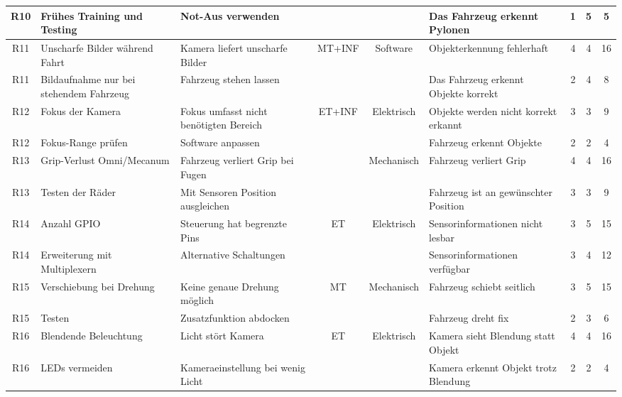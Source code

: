 \documentclass[../main.tex]{subfiles}
\begin{document}
\begin{landscape}
\begin{longtable}{|c|p{4cm}|p{4cm}|c|c|p{4cm}|c|c|c|}
\rowcolor{white} R10 & Frühes Training und Testing & Not-Aus verwenden & & & Das Fahrzeug erkennt Pylonen & 1 & 5 & 5 \\ \hline
\rowcolor[HTML]{F5F5F5} R11 & Unscharfe Bilder während Fahrt & Kamera liefert unscharfe Bilder & MT+INF & Software & Objekterkennung fehlerhaft & 4 & 4 & 16 \\ \hline
\rowcolor[HTML]{F5F5F5} R11 & Bildaufnahme nur bei stehendem Fahrzeug & Fahrzeug stehen lassen & & & Das Fahrzeug erkennt Objekte korrekt & 2 & 4 & 8 \\ \hline

\rowcolor{white} R12 & Fokus der Kamera & Fokus umfasst nicht benötigten Bereich & ET+INF & Elektrisch & Objekte werden nicht korrekt erkannt & 3 & 3 & 9 \\ \hline
\rowcolor{white} R12 & Fokus-Range prüfen & Software anpassen & & & Fahrzeug erkennt Objekte & 2 & 2 & 4 \\ \hline

\rowcolor[HTML]{F5F5F5} R13 & Grip-Verlust Omni/Mecanum & Fahrzeug verliert Grip bei Fugen & & Mechanisch & Fahrzeug verliert Grip & 4 & 4 & 16 \\ \hline

\rowcolor[HTML]{F5F5F5} R13 & Testen der Räder & Mit Sensoren Position ausgleichen & & & Fahrzeug ist an gewünschter Position & 3 & 3 & 9 \\ \hline
\rowcolor{white} R14 & Anzahl GPIO & Steuerung hat begrenzte Pins & ET & Elektrisch & Sensorinformationen nicht lesbar & 3 & 5 & 15 \\ \hline
\rowcolor{white} R14 & Erweiterung mit Multiplexern & Alternative Schaltungen & & & Sensorinformationen verfügbar & 3 & 4 & 12 \\ \hline

\rowcolor[HTML]{F5F5F5} R15 & Verschiebung bei Drehung & Keine genaue Drehung möglich & MT & Mechanisch & Fahrzeug schiebt seitlich & 3 & 5 & 15 \\ \hline
\rowcolor[HTML]{F5F5F5} R15 & Testen & Zusatzfunktion abdocken & & & Fahrzeug dreht fix & 2 & 3 & 6 \\ \hline

\rowcolor{white} R16 & Blendende Beleuchtung & Licht stört Kamera & ET & Elektrisch & Kamera sieht Blendung statt Objekt & 4 & 4 & 16 \\ \hline
\rowcolor{white} R16 & LEDs vermeiden & Kameraeinstellung bei wenig Licht & & & Kamera erkennt Objekt trotz Blendung & 2 & 2 & 4 \\ \hline

\end{longtable}
\normalsize    
\end{landscape}
\end{document}
